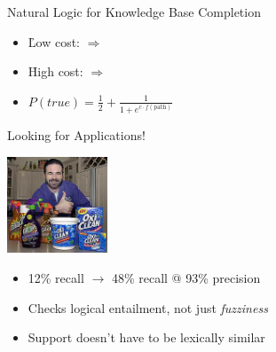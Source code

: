 \documentclass[hyperref]{beamer}
\begin{document}
\begin{frame}{Natural Logic for Knowledge Base Completion}
\begin{center}
  \resizebox{5cm}{!}{\teaserSearch}
\end{center}

\begin{itemize}
  \item \h{Low cost:}  $\Rightarrow$ 
  \item \h{High cost:}  $\Rightarrow$ 
\end{itemize}
\pause

\begin{itemize}
  \item $P(true) = \frac{1}{2} + \frac{1}{1 + e^{c \cdot f(\textrm{path})}}$
\end{itemize}
\pause

\end{frame}


\begin{frame}{Looking for Applications!}
\begin{center}
  \includegraphics[width=3cm]{../img/billy-mays.jpg}
\end{center}
\pause

\begin{itemize}
  \item 12\% recall $\rightarrow$ 48\% recall @ 93\% precision
\end{itemize}
\pause

\begin{itemize}
  \item Checks logical entailment, not just \textit{fuzziness}
  \item Support doesn't have to be lexically similar
\end{itemize}
\pause

\end{frame}
\end{document}
